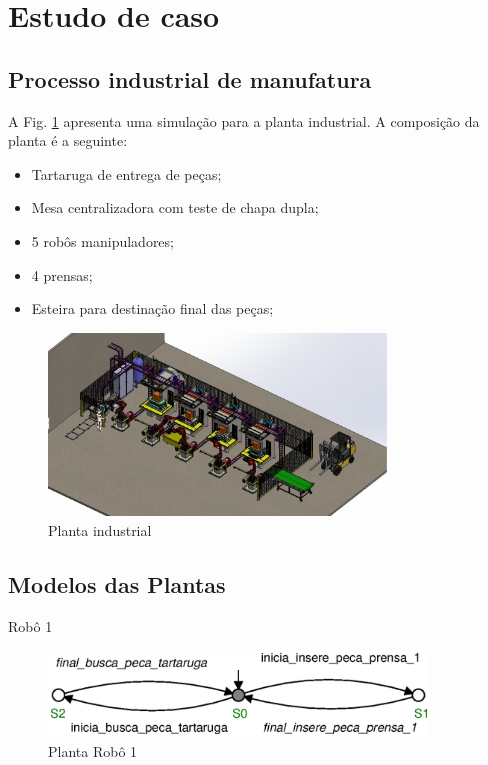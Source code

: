 \section{Estudo de caso}
\subsection{Processo industrial de manufatura}
A Fig. \ref{fig:processo} apresenta uma simulação para a planta industrial.
A composição da planta é a seguinte:
\begin{itemize}
    \item Tartaruga de entrega de peças;
    \item Mesa centralizadora com teste de chapa dupla;
    \item 5 robôs manipuladores;
    \item 4 prensas;
    \item Esteira para destinação final das peças;
\end{itemize}

\begin{figure}[H]%
    \centering
    \includegraphics[width=0.8\textwidth]{imagens/processo.eps}
    \caption{Planta industrial}\label{fig:processo}
\end{figure}

\subsection{Modelos das Plantas}
Robô 1
\begin{figure}[H]%
    \centering
    \includegraphics[width=0.9\textwidth]{imagens/robo_1.eps}
    \caption{Planta Robô 1}\label{fig:robo1}
\end{figure}

